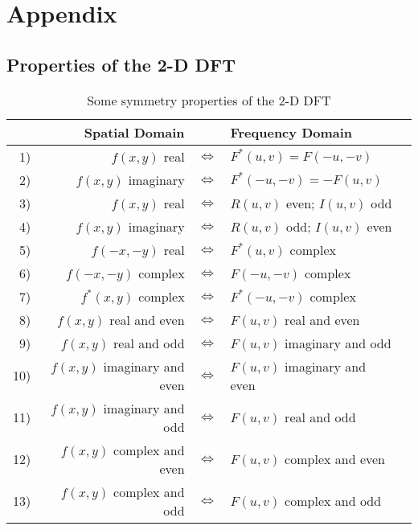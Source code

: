 \newpage
\appendix
{}
\section{Appendix}
\subsection{Properties of the 2-D DFT}


\begin{table}[htbp]
	\centering
	\begin{tabular}{|rrllp{0.1cm}|}
	\hline
	& \textbf{Spatial Domain} & & \textbf{Frequency Domain} & \\ \hline
	1) & $f(x,y)$ real & $\Leftrightarrow$ & $F^*(u,v) = F(-u,-v)$ & \\
	2) & $f(x,y)$ imaginary & $\Leftrightarrow$ & $F^*(-u,-v) = -F(u,v)$ & \\
	3) & $f(x,y)$ real & $\Leftrightarrow$ & $R(u,v)$ even; $I(u,v)$ odd & \\
	4) & $f(x,y)$ imaginary & $\Leftrightarrow$ & $R(u,v)$ odd; $I(u,v)$ even & \\
	5) & $f(-x,-y)$ real & $\Leftrightarrow$ & $F^*(u,v)$ complex & \\
	6) & $f(-x,-y)$ complex & $\Leftrightarrow$ & $F(-u,-v)$ complex & \\
	7) & $f^*(x,y)$ complex & $\Leftrightarrow$ & $F^*(-u,-v)$ complex & \\
	8) & $f(x,y)$ real and even & $\Leftrightarrow$ & $F(u,v)$ real and even & \\
	9) & $f(x,y)$ real and odd & $\Leftrightarrow$ & $F(u,v)$ imaginary and odd & \\
	10) & $f(x,y)$ imaginary and even & $\Leftrightarrow$ & $F(u,v)$ imaginary and even & \\
	11) & $f(x,y)$ imaginary and odd & $\Leftrightarrow$ & $F(u,v)$ real and odd & \\
	12) & $f(x,y)$ complex and even & $\Leftrightarrow$ & $F(u,v)$ complex and even & \\
	13) & $f(x,y)$ complex and odd & $\Leftrightarrow$ & $F(u,v)$ complex and odd & \\
	\hline
	\end{tabular}
	\caption{Some symmetry properties of the 2-D DFT}
	\label{tab:Symmetry_2D_DFT}
\end{table}

